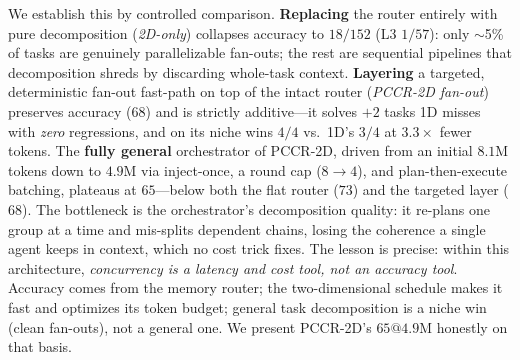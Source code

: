 \documentclass[10pt,twocolumn]{article}
\begin{document}
We establish this by controlled comparison. \textbf{Replacing} the router entirely with pure
decomposition (\emph{2D-only}) collapses accuracy to $18/152$ (L3 $1/57$): only $\sim$5\% of tasks are
genuinely parallelizable fan-outs; the rest are sequential pipelines that decomposition shreds by
discarding whole-task context. \textbf{Layering} a targeted, deterministic fan-out fast-path on top of
the intact router (\emph{PCCR-2D fan-out}) preserves accuracy ($68$) and is strictly additive---it
solves $+2$ tasks 1D misses with \emph{zero} regressions, and on its niche wins $4/4$ vs.\ 1D's $3/4$
at $3.3\times$ fewer tokens. The \textbf{fully general} orchestrator of PCCR-2D, driven from an
initial $8.1$M tokens down to $4.9$M via inject-once, a round cap ($8{\to}4$), and plan-then-execute
batching, plateaus at $65$---below both the flat router ($73$) and the targeted layer ($68$). The
bottleneck is the orchestrator's decomposition quality: it re-plans one group at a time and mis-splits
dependent chains, losing the coherence a single agent keeps in context, which no cost trick fixes.
The lesson is precise: within this architecture, \emph{concurrency is a latency and cost tool, not an
accuracy tool}. Accuracy comes from the memory router; the two-dimensional schedule makes it fast and
optimizes its token budget; general task decomposition is a niche win (clean fan-outs), not a general
one. We present PCCR-2D's $65@4.9$M honestly on that basis.
\end{document}

